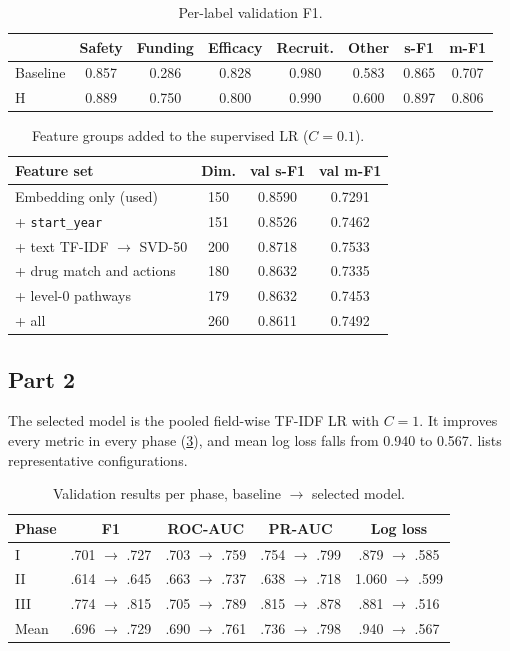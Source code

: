 \begin{table}[t]
\centering
\footnotesize
\setlength{\tabcolsep}{3pt}
\begin{tabular}{@{}lccccccc@{}}
\toprule
 & Safety & Funding & Efficacy & Recruit. & Other & s-F1 & m-F1 \\
\midrule
Baseline & 0.857 & 0.286 & 0.828 & 0.980 & 0.583 & 0.865 & 0.707 \\
H & 0.889 & 0.750 & 0.800 & 0.990 & 0.600 & 0.897 & 0.806 \\
\bottomrule
\end{tabular}
\caption{Per-label validation F1.}
\label{tab:perlabel}
\end{table}

\begin{table}[t]
\centering
\footnotesize
\begin{tabular}{@{}lccc@{}}
\toprule
Feature set & Dim. & val s-F1 & val m-F1 \\
\midrule
Embedding only (used) & 150 & 0.8590 & 0.7291 \\
+ \texttt{start\_year} & 151 & 0.8526 & 0.7462 \\
+ text TF-IDF $\rightarrow$ SVD-50 & 200 & 0.8718 & 0.7533 \\
+ drug match and actions & 180 & 0.8632 & 0.7335 \\
+ level-0 pathways & 179 & 0.8632 & 0.7453 \\
+ all & 260 & 0.8611 & 0.7492 \\
\bottomrule
\end{tabular}
\caption{Feature groups added to the supervised LR ($C=0.1$).}
\label{tab:feat}
\end{table}

\subsection{Part 2}

The selected model is the pooled field-wise TF-IDF LR with $C=1$.
It improves every metric in every phase (\cref{tab:p2main}), and mean log loss falls from 0.940 to 0.567.
 lists representative configurations.

\begin{table}[t]
\centering
\footnotesize
\setlength{\tabcolsep}{2.5pt}
\begin{tabular}{@{}lcccc@{}}
\toprule
Phase & F1 & ROC-AUC & PR-AUC & Log loss \\
\midrule
I & .701 $\rightarrow$ .727 & .703 $\rightarrow$ .759 & .754 $\rightarrow$ .799 & .879 $\rightarrow$ .585 \\
II & .614 $\rightarrow$ .645 & .663 $\rightarrow$ .737 & .638 $\rightarrow$ .718 & 1.060 $\rightarrow$ .599 \\
III & .774 $\rightarrow$ .815 & .705 $\rightarrow$ .789 & .815 $\rightarrow$ .878 & .881 $\rightarrow$ .516 \\
Mean & .696 $\rightarrow$ .729 & .690 $\rightarrow$ .761 & .736 $\rightarrow$ .798 & .940 $\rightarrow$ .567 \\
\bottomrule
\end{tabular}
\caption{Validation results per phase, baseline $\rightarrow$ selected model.}
\label{tab:p2main}
\end{table}

